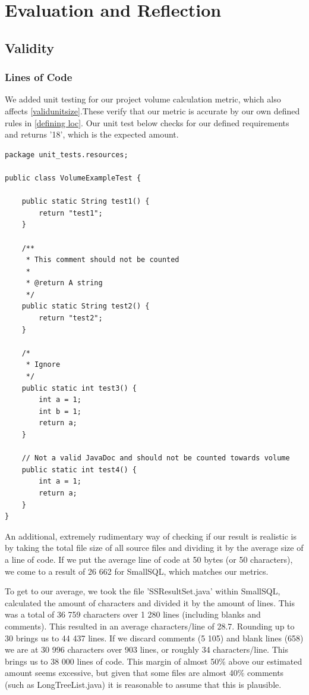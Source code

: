 \documentclass{article}
\begin{document}
\section{Evaluation and Reflection}

\subsection{Validity}

\subsubsection{Lines of Code} \label{validloc}
We added unit testing for our project volume calculation metric, which also affects \ref{validunitsize}.These verify that our metric is accurate by our own defined rules in \ref{defining loc}. 
Our unit test below checks for our defined requirements and returns '18', which is the expected amount.

\begin{lstlisting}
package unit_tests.resources;

public class VolumeExampleTest {
	
	public static String test1() {
		return "test1";
	}
	
	/**
	 * This comment should not be counted
	 * 
	 * @return A string
	 */
	public static String test2() {
		return "test2";
	}
	
	/*
	 * Ignore
	 */
	public static int test3() {
		int a = 1;
		int b = 1;
		return a;
	}
	
	// Not a valid JavaDoc and should not be counted towards volume
	public static int test4() {
		int a = 1;
		return a;
	}
}
\end{lstlisting}

An additional, extremely rudimentary way of checking if our result is realistic is by taking the total file size of all source files and dividing it by the average size of a line of code. If we put the average line of code at 50 bytes (or 50 characters), we come to a result of 26 662 for SmallSQL, which matches our metrics.

To get to our average, we took the file 'SSResultSet.java' within SmallSQL, calculated the amount of characters and divided it by the amount of lines. This was a total of 36 759 characters over 1 280 lines (including blanks and comments). This resulted in an average characters/line of 28.7. Rounding up to 30 brings us to 44 437 lines. If we discard comments (5 105) and blank lines (658) we are at 30 996 characters over 903 lines, or roughly 34 characters/line. This brings us to 38 000 lines of code. This margin of almost 50\% above our estimated amount seems excessive, but given that some files are almost 40\% comments (such as LongTreeList.java) it is reasonable to assume that this is plausible.
\end{document}
